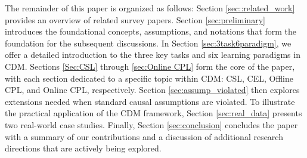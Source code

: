 %


The remainder of this paper is organized as follows: Section \ref{sec::related_work} provides an overview of related survey papers. Section \ref{sec:preliminary} introduces the foundational concepts, assumptions, and notations that form the foundation for the subsequent discussions. In Section \ref{sec:3task6paradigm}, we offer a detailed introduction to the three key tasks and six learning paradigms in \acrshort{CDM}. Sections \ref{Sec:CSL} through \ref{sec:Online CPL} form the core of the paper, with each section dedicated to a specific topic within \acrshort{CDM}: \acrshort{CSL}, \acrshort{CEL}, Offline \acrshort{CPL}, and Online \acrshort{CPL}, respectively. Section \ref{sec:assump_violated} then explores extensions needed when standard causal assumptions are violated. To illustrate the practical application of the \acrshort{CDM} framework, Section \ref{sec:real_data} presents two real-world case studies. Finally, Section \ref{sec:conclusion} concludes the paper with a summary of our contributions and a discussion of additional research directions that are actively being explored.

